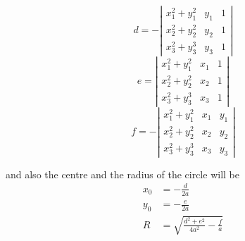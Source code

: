 \begin{equation}
d=-
\left|
\begin{matrix}
x_1^2+y_1^2 & y_1 & 1\\
x_2^2+y_2^2 & y_2 & 1\\
x_3^2+y_3^3 & y_3  & 1
\end{matrix}
\right|
\end{equation}
\begin{equation}
e=
\left|
\begin{matrix}
x_1^2+y_1^2 & x_1 & 1\\
x_2^2+y_2^2 & x_2 & 1\\
x_3^2+y_3^3 & x_3 & 1
\end{matrix}
\right|
\end{equation}
\begin{equation}
f=-
\left|
\begin{matrix}
x_1^2+y_1^2 & x_1 & y_1 \\
x_2^2+y_2^2 & x_2 & y_2 \\
x_3^2+y_3^3 & x_3 & y_3
\end{matrix}
\right|
\end{equation}

and also the centre and the radius of the circle will be
\begin{equation}
 \begin{split}
x_0 &=-\frac{d}{2a}\\
y_0 &=-\frac{e}{2a}\\
R &=\sqrt{\frac{d^2+e^2}{4a^2}-\frac{f}{a}}
\end{split}
\end{equation}